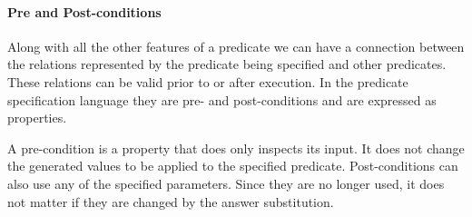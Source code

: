 \paragraph{\bf Pre and Post-conditions}

Along with all the other features of a predicate we can have a
connection between the relations represented by the predicate being
specified and other predicates.
%
These relations can be valid prior to or after execution.
%
In the predicate specification language they are pre- and
post-conditions and are expressed as \plqc{} properties.


A pre-condition is a property that does only inspects its input.
%
It does not change the generated values to be applied to the specified
predicate.
%
Post-conditions can also use any of the specified parameters.
%
Since they are no longer used, it does not matter if they are changed by
the answer substitution.

